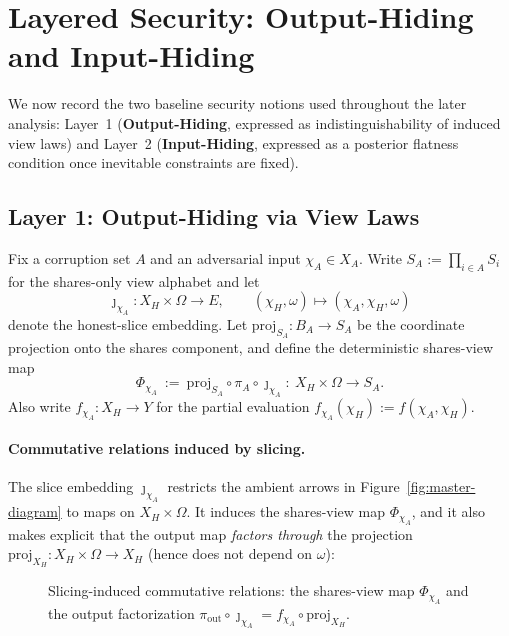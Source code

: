 \documentclass[11pt,a4paper]{article}
\theoremstyle{definition}
\theoremstyle{plain}
\begin{document}
\section{Layered Security: Output-Hiding and Input-Hiding}
\label{sec:layered-security}
We now record the two baseline security notions used throughout the later analysis: Layer~1 (\textbf{Output-Hiding}, expressed as indistinguishability of induced view laws) and Layer~2 (\textbf{Input-Hiding}, expressed as a posterior flatness condition once inevitable constraints are fixed).

\subsection{Layer 1: Output-Hiding via View Laws}
Fix a corruption set $A$ and an adversarial input $\chi_A\in X_A$.
Write $S_A:=\prod_{i\in A}S_i$ for the shares-only view alphabet and let
\[
\jmath_{\chi_A}:X_H\times \Omega\to E,\qquad (\chi_H,\omega)\longmapsto (\chi_A,\chi_H,\omega)
\]
denote the honest-slice embedding.
Let $\mathrm{proj}_{S_A}:B_A\to S_A$ be the coordinate projection onto the shares component, and define the deterministic shares-view map
\[
\Phi_{\chi_A}\ :=\ \mathrm{proj}_{S_A}\circ \pi_A\circ \jmath_{\chi_A}:\ X_H\times \Omega\to S_A.
\]
Also write $f_{\chi_A}:X_H\to Y$ for the partial evaluation $f_{\chi_A}(\chi_H):=f(\chi_A,\chi_H)$.

\paragraph{Commutative relations induced by slicing.}
The slice embedding $\jmath_{\chi_A}$ restricts the ambient arrows in Figure~\ref{fig:master-diagram} to maps on $X_H\times\Omega$. It induces the shares-view map $\Phi_{\chi_A}$, and it also makes explicit that the output map \emph{factors through} the projection $\mathrm{proj}_{X_H}:X_H\times\Omega\to X_H$ (hence does not depend on $\omega$):
\begin{figure}[ht]
\centering
{}
\caption{Slicing-induced commutative relations: the shares-view map $\Phi_{\chi_A}$ and the output factorization $\pi_{\mathrm{out}}\circ \jmath_{\chi_A}=f_{\chi_A}\circ \mathrm{proj}_{X_H}$.}
\label{fig:slicing-relations}
\end{figure}
\end{document}
